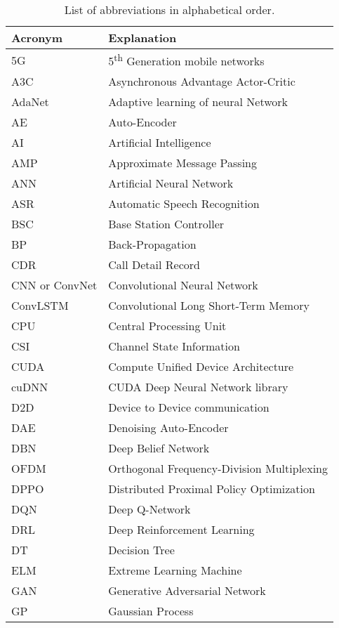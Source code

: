 \documentclass[journal,comsoc,letter]{IEEEtran}
\begin{document}
\begin{table}[htpb!]
\centering
\caption{List of abbreviations in alphabetical order.}
\label{tab:abbreviations}
\begin{tabular}{|C{2.1cm}||C{5.7cm}|}
\hline
Acronym & Explanation \\\hline\hline
5G & 5\textsuperscript{th} Generation mobile networks \\\hline
A3C & Asynchronous Advantage Actor-Critic \\\hline
AdaNet & Adaptive learning of neural Network \\\hline
AE & Auto-Encoder \\\hline
AI & Artificial Intelligence \\\hline
AMP &  Approximate Message Passing \\\hline
ANN & Artificial Neural Network \\\hline
ASR & Automatic Speech Recognition \\\hline
BSC & Base Station Controller \\\hline
BP & Back-Propagation \\\hline
CDR & Call Detail Record \\\hline
CNN or ConvNet & Convolutional Neural Network \\\hline
ConvLSTM & Convolutional Long Short-Term Memory \\\hline
CPU & Central Processing Unit \\\hline
CSI & Channel State Information \\\hline
CUDA & Compute Unified Device Architecture \\\hline
cuDNN & CUDA Deep Neural Network library \\\hline
D2D & Device to Device communication \\\hline
DAE & Denoising Auto-Encoder \\\hline
DBN & Deep Belief Network \\\hline
OFDM &  Orthogonal Frequency-Division Multiplexing\\\hline
DPPO & Distributed Proximal Policy Optimization \\\hline
DQN & Deep Q-Network \\\hline
DRL & Deep Reinforcement Learning \\\hline
DT & Decision Tree \\\hline
ELM & Extreme Learning Machine \\\hline
GAN & Generative Adversarial Network \\\hline
GP & Gaussian Process \\\hline

\end{tabular}
\end{table}
\end{document}
